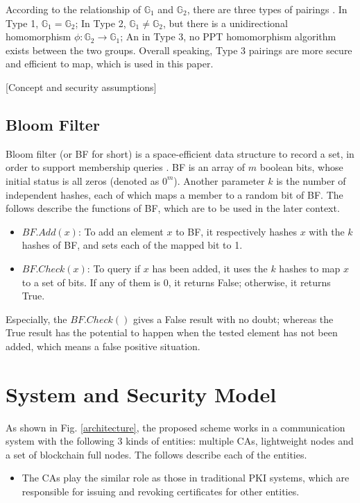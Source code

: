 \documentclass[conference]{IEEEtran}
\begin{document}
According to the relationship of $\mathbb{G}_1$ and $\mathbb{G}_2$, there are three types of pairings \cite{GALBRAITH20083113}. 
In Type 1, $\mathbb{G}_1 = \mathbb{G}_2$; In Type 2, $\mathbb{G}_1 \neq \mathbb{G}_2$, but there is a unidirectional homomorphism $\phi:\mathbb{G}_2 \rightarrow \mathbb{G}_1$; An in Type 3, no PPT homomorphism algorithm exists between the two groups.
Overall speaking, Type 3 pairings are more secure and efficient to map, which is used in this paper.

[Concept and security assumptions]

\subsection{Bloom Filter}
Bloom filter (or BF for short) is a space-efficient data structure to record a set, in order to support membership queries \cite{Bloom1970, broder2004network}.
BF is an array of $m$ boolean bits, whose initial status is all zeros (denoted as $0^m$). Another parameter $k$ is the number of independent hashes, each of which maps a member to a random bit of BF. The follows describe the functions of BF, which are to be used in the later context.

\begin{itemize}
    \item $BF.Add(x)$: To add an element $x$ to BF, it respectively hashes $x$ with the $k$ hashes of BF, and sets each of the mapped bit to 1.
	\item $BF.Check(x)$: To query if $x$ has been added, it uses the $k$ hashes to map $x$ to a set of bits. If any of them is 0, it returns False; otherwise, it returns True. 
\end{itemize}

Especially, the $BF.Check()$ gives a False result with no doubt; whereas the True result has the potential to happen when the tested element has not been added, which means a false positive situation.


\section{System and Security Model}
As shown in Fig. \ref{architecture}, the proposed scheme works in a communication system with the following 3 kinds of entities: multiple CAs, lightweight nodes and a set of blockchain full nodes. The follows describe each of the entities. 

\begin{itemize}
	\item The CAs play the similar role as those in traditional PKI systems, which are responsible for issuing and revoking certificates for other entities. 
\end{itemize}
\end{document}

